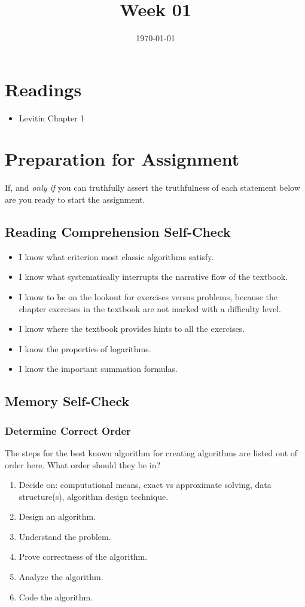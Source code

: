 \documentclass[12pt]{amsart}
\title{Week 01}
\date{\today}
\begin{document}
\maketitle
\section{Readings}
\begin{itemize}
	\item Levitin Chapter 1
\end{itemize}
\section{Preparation for Assignment}
If, and \textit{only if} you can truthfully assert the truthfulness of each statement below are you ready to start the assignment.
\subsection {Reading Comprehension Self-Check}
\begin{itemize}
	\item I know what criterion most classic algorithms satisfy.
	\item I know what systematically interrupts the narrative flow of the textbook.
	\item I know to be on the lookout for exercises versus problems, because the chapter exercises in the textbook are not marked with a difficulty level.
	\item I know where the textbook provides hints to all the exercises.
	\item I know the properties of logarithms.
	\item I know the important summation formulas.
\end{itemize}
\subsection{Memory Self-Check}
\subsubsection{Determine Correct Order}

The steps for the best known algorithm for creating algorithms are listed out of order here. What order should they be in?
\begin{enumerate}
	\item Decide on: computational means, exact vs approximate solving, data structure(s), algorithm
 design technique.
 	\item Design an algorithm.
	\item Understand the problem.
	\item Prove correctness of the algorithm.
	\item Analyze the algorithm.
	\item Code the algorithm.
\end{enumerate}
\end{document}
